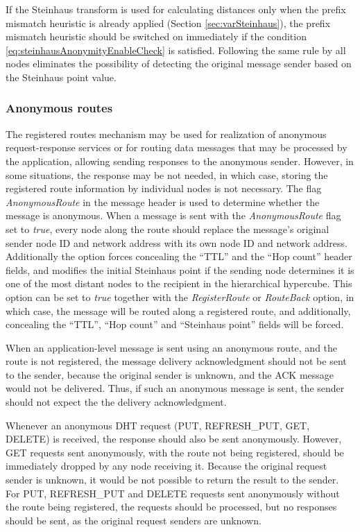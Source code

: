 If the Steinhaus transform is used for calculating distances only when the prefix mismatch heuristic is already applied (Section \ref{sec:varSteinhaus}), the prefix mismatch heuristic should be switched on immediately if the condition \ref{eq:steinhausAnonymityEnableCheck} is satisfied. Following the same rule by all nodes eliminates the possibility of detecting the original message sender based on the Steinhaus point value.





\subsubsection{Anonymous routes}

The registered routes mechanism may be used for realization of anonymous request-response services or for routing data messages that may be processed by the application, allowing sending responses to the anonymous sender. However, in some situations, the response may be not needed, in which case, storing the registered route information by individual nodes is not necessary. The flag \emph{AnonymousRoute} in the message header is used to determine whether the message is anonymous. When a message is sent with the \emph{AnonymousRoute} flag set to \emph{true}, every node along the route should replace the message's original sender node ID and network address with its own node ID and network address. Additionally the option forces concealing the ``TTL'' and the ``Hop count'' header fields, and modifies the initial Steinhaus point if the sending node determines it is one of the most distant nodes to the recipient in the hierarchical hypercube. This option can be set to \emph{true} together with the \emph{RegisterRoute} or \emph{RouteBack} option, in which case, the message will be routed along a registered route, and additionally, concealing the ``TTL'', ``Hop count'' and ``Steinhaus point'' fields will be forced.

When an application-level message is sent using an anonymous route, and the route is not registered, the message delivery acknowledgment should not be sent to the sender, because the original sender is unknown, and the ACK message would not be delivered. Thus, if such an anonymous message is sent, the sender should not expect the the delivery acknowledgment.

Whenever an anonymous DHT request (PUT, REFRESH\_PUT, GET, DELETE) is received, the response should also be sent anonymously. However, GET requests sent anonymously, with the route not being registered, should be immediately dropped by any node receiving it. Because the original request sender is unknown, it would be not possible to return the result to the sender. For PUT, REFRESH\_PUT and DELETE requests sent anonymously without the route being registered, the requests should be processed, but no responses should be sent, as the original request senders are unknown.

